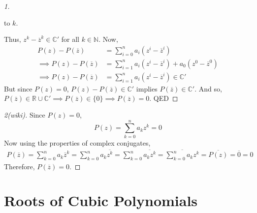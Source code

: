 \begin{proof}[1]
\begin{remark}
        to $k$.
    \end{remark}
    Thus, $z^{k} - \overline{z}^{k}\in \mathbb{C}'$ for all $k\in \mathbb{N}$. Now,
    \begin{align*}
        P(z) - P(\overline{z}) &= \sum_{i=0}^{n} a_{i} \left( z^{i} - \overline{z}^{i} \right)\\
        \implies P(z) - P(\overline{z}) &= \sum_{i=1}^{n} a_{i} \left( z^{i} - \overline{z}^{i} \right) 
                               + a_{0}\left( z^{0} - \overline{z}^{0} \right) \\
        \implies P(z) - P(\overline{z}) &= \sum_{i=1}^{n} a_{i} \left( z^{i} - \overline{z}^{i} \right) \in \mathbb{C}'
    \end{align*}
    But since $P(z)=0$, $P(z) - P(\overline{z}) \in \mathbb{C}'$ implies $P(\overline{z}) \in \mathbb{C}'$. And so, 
    $P(\overline{z})\in \mathbb{R} \cup \mathbb{C}' \implies P(\overline{z}) \in \{0\} \implies P(\overline{z}) = 0$. 
    \textsf{QED}
\end{proof}
\begin{proof}[2(wiki)]
    Since $P(z)=0$,
    \begin{equation*}
        P(z) = \sum_{k=0}^{n} a_{k} z^{k} = 0
    \end{equation*}
    Now using the properties of complex conjugates,
    \begin{align*}
        P(\overline{z}) = \sum_{k=0}^{n} a_{k} \overline{z}^{k} 
                        = \sum_{k=0}^{n} a_{k} \overline{z^{k}} 
                        = \sum_{k=0}^{n} \overline{a_{k} z^{k}} 
                        = \overline{\sum_{k=0}^{n} a_{k} z^{k}} 
                        = \overline{P(z)} 
                        = \overline{0} 
                        = 0
    \end{align*}
    Therefore, $P(\overline{z})=0$.
\end{proof}
\section{Roots of Cubic Polynomials}


